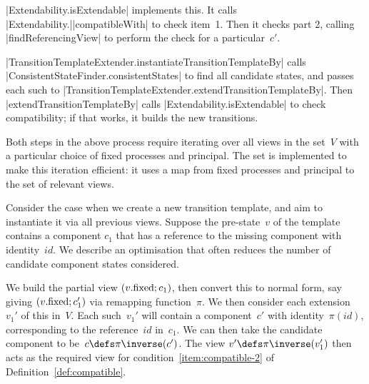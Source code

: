 
\begin{impNote}
|Extendability.isExtendable| implements this.  It calls
|Extendability.|\linebreak[1]|compatibleWith| to check item~1.  Then it checks part 2, calling
|findReferencingView| to  perform the check for a particular~$c'$. 
\end{impNote}

\begin{impNote}
|TransitionTemplateExtender.instantiateTransitionTemplateBy| calls
|ConsistentStateFinder.consistentStates| to find all candidate states, and
passes each such to |TransitionTemplateExtender.extendTransitionTemplateBy|.
Then
|extendTransitionTemplateBy| calls |Extendability.isExtendable| to check
compatibility; if that works, it builds the new transitions.
\end{impNote}

\begin{opt}
Both steps in the above process require iterating over all views in the
set~$V$ with a particular choice of fixed processes and principal.  The set is
implemented to make this iteration efficient: it uses a map from fixed
processes and principal to the set of relevant views.
\end{opt}

\begin{opt}
Consider the case when we create a new transition template, and aim to
instantiate it via all previous views.  Suppose the pre-state~$v$ of the
template contains a component $c_1$ that has a reference to the missing
component with identity~$id$.  We describe an optimisation that often reduces
the number of candidate component states considered.

We build the partial view $(v.\mathrm{fixed}; c_1)$, then convert this to normal
form, say giving $(v.\mathrm{fixed}; c_1')$ via remapping function~$\pi$.  We then
consider each extension~$v_1'$ of this in~$V$.  Each such~$v_1'$ will contain
a component~$c'$ with identity~$\pi(id)$, corresponding to the reference~$id$
in~$c_1$.  We can then take the candidate component to be~$c \defs
\pi\inverse(c')$.  The view $v' \defs \pi\inverse(v_1')$ then acts as the
required view for condition~\ref{item:compatible-2} of
Definition~\ref{def:compatible}.  
\end{opt}






